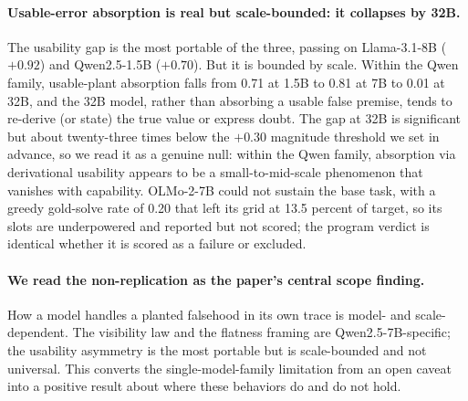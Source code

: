 \paragraph{Usable-error absorption is real but scale-bounded: it collapses
by 32B.} The usability gap is the most portable of the three, passing on
Llama-3.1-8B ($+0.92$) and Qwen2.5-1.5B ($+0.70$). But it is bounded by
scale. Within the Qwen family, usable-plant absorption falls from 0.71 at
1.5B to 0.81 at 7B to 0.01 at 32B, and the 32B model, rather than absorbing
a usable false premise, tends to re-derive (or state) the true value or
express doubt.
The gap at 32B is significant but about twenty-three times below the $+0.30$
magnitude threshold we set in advance, so we read it as a genuine null:
within the Qwen family, absorption via derivational usability appears to be
a small-to-mid-scale phenomenon that vanishes with capability.
OLMo-2-7B could not sustain the base task, with a greedy gold-solve rate of
0.20 that left its grid at 13.5 percent of target, so its slots are
underpowered and reported but not scored; the program verdict is identical
whether it is scored as a failure or excluded.

\paragraph{We read the non-replication as the paper's central scope
finding.} How a model handles a planted falsehood in its own trace is
model- and scale-dependent. The visibility law and the flatness framing are
Qwen2.5-7B-specific; the usability asymmetry is the most portable but is
scale-bounded and not universal. This converts the single-model-family
limitation from an open caveat into a positive result about where these
behaviors do and do not hold.

